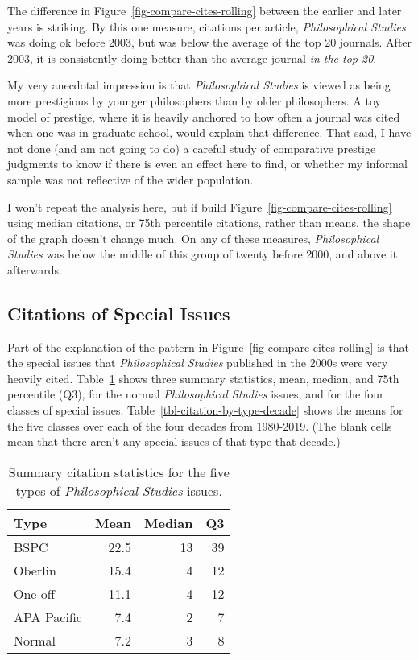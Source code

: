 \documentclass[
  11pt,
  letterpaper,
  DIV=11,
  numbers=noendperiod,
  twoside]{scrartcl}
\begin{document}
The difference in Figure~\ref{fig-compare-cites-rolling} between the
earlier and later years is striking. By this one measure, citations per
article, \emph{Philosophical Studies} was doing ok before 2003, but was
below the average of the top 20 journals. After 2003, it is consistently
doing better than the average journal \emph{in the top 20}.

My very anecdotal impression is that \emph{Philosophical Studies} is
viewed as being more prestigious by younger philosophers than by older
philosophers. A toy model of prestige, where it is heavily anchored to
how often a journal was cited when one was in graduate school, would
explain that difference. That said, I have not done (and am not going to
do) a careful study of comparative prestige judgments to know if there
is even an effect here to find, or whether my informal sample was not
reflective of the wider population.

I won't repeat the analysis here, but if build
Figure~\ref{fig-compare-cites-rolling} using median citations, or 75th
percentile citations, rather than means, the shape of the graph doesn't
change much. On any of these measures, \emph{Philosophical Studies} was
below the middle of this group of twenty before 2000, and above it
afterwards.

\subsection{Citations of Special
Issues}\label{sec-citations-of-special-issues}

Part of the explanation of the pattern in
Figure~\ref{fig-compare-cites-rolling} is that the special issues that
\emph{Philosophical Studies} published in the 2000s were very heavily
cited. Table~\ref{tbl-citation-by-type} shows three summary statistics,
mean, median, and 75th percentile (Q3), for the normal
\emph{Philosophical Studies} issues, and for the four classes of special
issues. Table~\ref{tbl-citation-by-type-decade} shows the means for the
five classes over each of the four decades from 1980-2019. (The blank
cells mean that there aren't any special issues of that type that
decade.)

\begin{longtable}[]{@{}lrrr@{}}

\caption{\label{tbl-citation-by-type}Summary citation statistics for the
five types of \emph{Philosophical Studies} issues.}

\tabularnewline

\toprule\noalign{}
Type & Mean & Median & Q3 \\
\midrule\noalign{}
\endhead
\bottomrule\noalign{}
\endlastfoot
BSPC & 22.5 & 13 & 39 \\
Oberlin & 15.4 & 4 & 12 \\
One-off & 11.1 & 4 & 12 \\
APA Pacific & 7.4 & 2 & 7 \\
Normal & 7.2 & 3 & 8 \\

\end{longtable}
\end{document}

